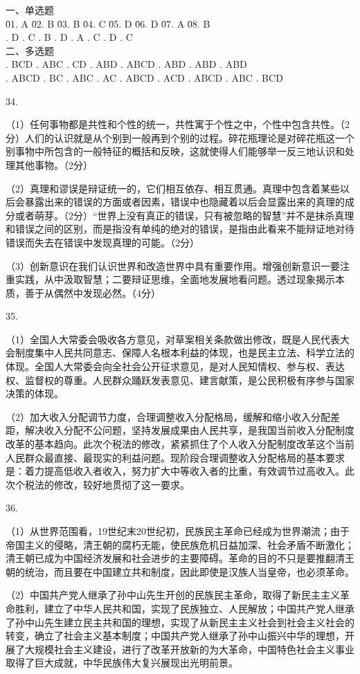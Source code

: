 \documentclass[a4paper]{article}
\begin{document}
\begin{tabbing}
一、单选题\\
\= 01. A \qquad \= 02. B \qquad \= 03. B \qquad \= 04. C \qquad \= 05. D \qquad \= 06. D \qquad \= 07. A \qquad \= 08. B \qquad \=\\
. D . C . B . D . A . C . D . C \\
二、多选题\\
. BCD  . ABC  . CD   . ABD  . ABCD . ABD  . ABD  . ABD  \\
. ABCD . BC   . ABC  . AC   . ABCD . ACD  . ABCD . ABC  . BCD
\end{tabbing}

34.

（1）任何事物都是共性和个性的统一，共性寓于个性之中，个性中包含共性。（2分）人们的认识就是从个别到一般再到个别的过程。碎花瓶理论是对碎花瓶这一个别事物中所包含的一般特征的概括和反映，这就使得人们能够举一反三地认识和处理其他事物。（2分）

（2）真理和谬误是辩证统一的，它们相互依存、相互贯通。真理中包含着某些以后会暴露出来的错误的方面或者因素，错误中也隐藏着以后会显露出来的真理的成分或者萌芽。（2分）“世界上没有真正的错误，只有被忽略的智慧”并不是抹杀真理和错误之间的区别，而是指没有单纯的绝对的错误，是指由此看来不能辩证地对待错误而失去在错误中发现真理的可能。（2分）

（3）创新意识在我们认识世界和改造世界中具有重要作用。增强创新意识一要注重实践，从中汲取智慧；二要辩证思维，全面地发展地看问题。透过现象揭示本质，善于从偶然中发现必然。（4分）

35.

（1）全国人大常委会吸收各方意见，对草案相关条款做出修改，既是人民代表大会制度集中人民共同意志、保障人名根本利益的体现，也是民主立法、科学立法的体现。全国人大常委会向全社会公开征求意见，是对人民知情权、参与权、表达权、监督权的尊重。人民群众踊跃发表意见、建言献策，是公民积极有序参与国家决策的体现。

（2）加大收入分配调节力度，合理调整收入分配格局，缓解和缩小收入分配差距，解决收入分配不公问题，坚持发展成果由人民共享，是我国当前收入分配制度改革的基本趋向。此次个税法的修改，紧紧抓住了个人收入分配制度改革这个当前人民群众最直接、最现实的利益问题。现阶段合理调整收入分配格局的基本要求是：着力提高低收入者收入，努力扩大中等收入者的比重，有效调节过高收入。此次个税法的修改，较好地贯彻了这一要求。

36.

（1）从世界范围看，19世纪末20世纪初，民族民主革命已经成为世界潮流；由于帝国主义的侵略，清王朝的腐朽无能，使民族危机日益加深、社会矛盾不断激化；清王朝已成为中国经济发展和社会进步的主要障碍。革命的目的不只是要推翻清王朝的统治，而且要在中国建立共和制度，因此即使是汉族人当皇帝，也必须革命。

（2）中国共产党人继承了孙中山先生开创的民族民主革命，取得了新民主主义革命胜利，建立了中华人民共和国，实现了民族独立、人民解放；中国共产党人继承了孙中山先生建立民主共和国的理想，实现了从新民主主义社会到社会主义社会的转变，确立了社会主义基本制度；中国共产党人继承了孙中山振兴中华的理想，开展了大规模社会主义建设，进行了改革开放新的为大革命，中国特色社会主义事业取得了巨大成就，中华民族伟大复兴展现出光明前景。
\end{document}
